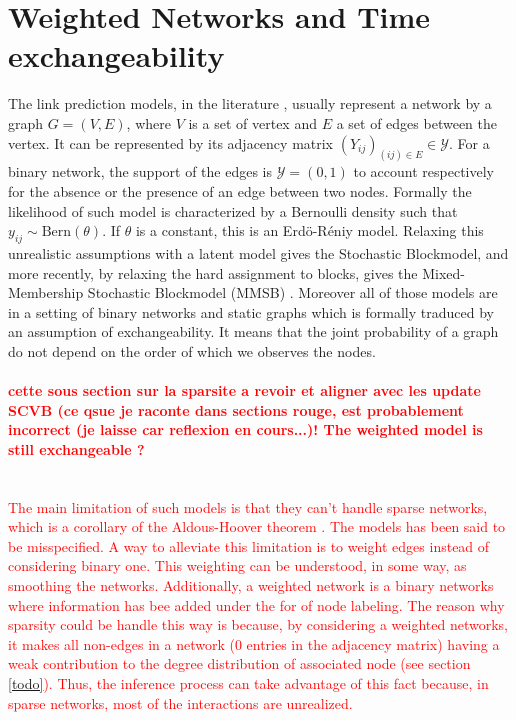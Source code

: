 
\section{Weighted Networks and Time exchangeability}

The link prediction models, in the literature \cite{goldenberg2010survey,lu2011link}, usually represent a network by a graph $G=(V,E)$, where $V$ is a set of vertex and $E$ a set of edges between the vertex. It can be represented by its adjacency matrix $(Y_{ij})_{(ij) \in E} \in \mathcal{Y}$. For a binary network, the support of the edges is $\mathcal{Y} = (0,1)$ to account respectively for the absence or the presence of an edge between two nodes. Formally the likelihood of such model is characterized by a Bernoulli density such that $y_{ij} \sim \mathrm{Bern}(\theta)$. If $\theta$ is a constant, this is an Erd\"o-R\'eniy model. Relaxing this unrealistic assumptions with a latent model gives the Stochastic Blockmodel, and more recently, by relaxing the hard assignment to blocks, gives the Mixed-Membership Stochastic Blockmodel (MMSB) \cite{MMSB}. Moreover all of those models are in a setting of binary networks and  static graphs which is formally traduced by an assumption of exchangeability. It means that the joint probability of a graph do not depend on the order of which we observes the nodes. %

\textcolor{red}{\paragraph{cette sous section sur la sparsite a revoir et aligner avec les update SCVB (ce qsue je raconte dans sections rouge, est probablement incorrect (je laisse car reflexion en cours...)! The weighted model is still exchangeable ?}~\\
The main limitation of such models is that they can't handle sparse networks, which is a corollary of the Aldous-Hoover theorem \cite{orbanz2015bayesian}. The models has been said to be misspecified. A way to alleviate this limitation is to weight edges instead of considering binary one. This weighting can be understood, in some way, as smoothing the networks. Additionally, a weighted network is a binary networks where information has bee added under the for of node labeling. The reason why sparsity could be handle this way is because, by considering a weighted networks, it makes all non-edges in a network (0 entries in the adjacency matrix) having a weak contribution to the degree distribution of associated node (see section \ref{todo}). Thus, the inference process can take advantage of this fact because, in sparse networks, most of the interactions are unrealized.}

